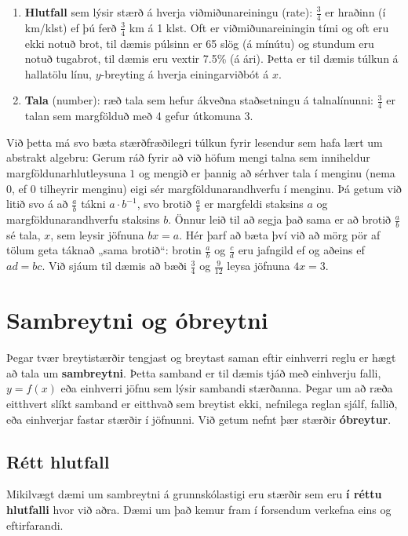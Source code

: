 \documentclass[
  icelandic,
]{book}
\begin{document}
\begin{enumerate}
\item
  \textbf{Hlutfall} sem lýsir stærð á hverja viðmiðunareiningu (rate): \(\frac{3}{4}\) er hraðinn (í km/klst) ef þú ferð \(\frac{3}{4}\) km á 1 klst. Oft er viðmiðunareiningin tími og oft eru ekki notuð brot, til dæmis púlsinn er 65 slög (á mínútu) og stundum eru notuð tugabrot, til dæmis eru vextir 7.5\% (á ári). Þetta er til dæmis túlkun á hallatölu línu, \(y\)-breyting á hverja einingarviðbót á \(x\).
\item
  \textbf{Tala} (number): ræð tala sem hefur ákveðna staðsetningu á talnalínunni: \(\frac{3}{4}\) er talan sem margfölduð með 4 gefur útkomuna 3.
\end{enumerate}

Við þetta má svo bæta stærðfræðilegri túlkun fyrir lesendur sem hafa lært um abstrakt algebru: Gerum ráð fyrir að við höfum mengi talna sem inniheldur margföldunarhlutleysuna \(1\) og mengið er þannig að sérhver tala í menginu (nema \(0\), ef \(0\) tilheyrir menginu) eigi sér margföldunarandhverfu í menginu. Þá getum við litið svo á að \(\frac{a}{b}\) tákni \(a\cdot b^{-1}\), svo brotið \(\frac{a}{b}\) er margfeldi staksins \(a\) og margföldunarandhverfu staksins \(b\). Önnur leið til að segja það sama er að brotið \(\frac{a}{b}\) sé tala, \(x\), sem leysir jöfnuna \(bx=a\). Hér þarf að bæta því við að mörg pör af tölum geta táknað „sama brotið``: brotin \(\frac{a}{b}\) og \(\frac{c}{d}\) eru jafngild ef og aðeins ef \(ad=bc\). Við sjáum til dæmis að bæði \(\frac{3}{4}\) og \(\frac{9}{12}\) leysa jöfnuna \(4x=3\).

\section{Sambreytni og óbreytni}\label{sambreytni-obreytni}

Þegar tvær breytistærðir tengjast og breytast saman eftir einhverri reglu er hægt að tala um \textbf{sambreytni}. Þetta samband er til dæmis tjáð með einhverju falli, \(y=f(x)\) eða einhverri jöfnu sem lýsir sambandi stærðanna. Þegar um að ræða eitthvert slíkt samband er eitthvað sem breytist ekki, nefnilega reglan sjálf, fallið, eða einhverjar fastar stærðir í jöfnunni. Við getum nefnt þær stærðir \textbf{óbreytur}.

\subsection{Rétt hlutfall}\label{rett-hlutfall}

Mikilvægt dæmi um sambreytni á grunnskólastigi eru stærðir sem eru \textbf{í réttu hlutfalli} hvor við aðra. Dæmi um það kemur fram í forsendum verkefna eins og eftirfarandi.
\end{document}
